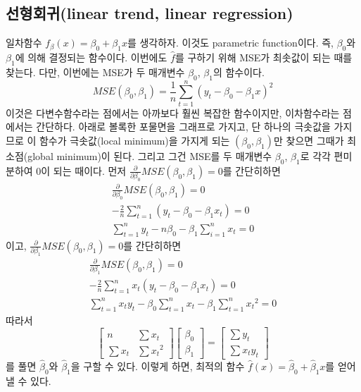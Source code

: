 \documentclass{article}
\begin{document}
\subsection{선형회귀(linear trend, linear regression)}
일차함수 \(f_\beta(x)=\beta_0+\beta_1x\)를 생각하자.\footnotemark
{}
이것도 parametric function이다.
즉, \(\beta_0\)와 \(\beta_1\)에 의해 결정되는 함수이다.
이번에도 \(\hat f\)를 구하기 위해 MSE가 최솟값이 되는 때를 찾는다.
다만, 이번에는 MSE가 두 매개변수 \(\beta_0\), \(\beta_1\)의 함수이다.
\[MSE(\beta_0,\beta_1)=\frac1n\sum_{t=1}^n(y_t-\beta_0-\beta_1x)^2\]
이것은 다변수함수라는 점에서는 아까보다 훨씬 복잡한 함수이지만, 이차함수라는 점에서는 간단하다.
아래로 볼록한 포물면을 그래프로 가지고, 단 하나의 극솟값을 가지므로 이 함수가 극솟값(local minimum)을 가지게 되는 \((\beta_0, \beta_1)\)만 찾으면 그때가 최소점(global minimum)이 된다.
그리고 그건 MSE를 두 매개변수 \(\beta_0\), \(\beta_1\)로 각각 편미분하여 0이 되는 때이다.
먼저 \(\frac{\partial}{\partial\beta_0}MSE(\beta_0,\beta_1)=0\)를 간단히하면
\begin{gather*}
\frac{\partial}{\partial\beta_0}MSE(\beta_0,\beta_1)=0\\
-\frac2n\sum_{t=1}^n(y_t-\beta_0-\beta_1x_t)=0\\
\sum_{t=1}^ny_t-n\beta_0-\beta_1\sum_{i=1}^nx_t=0
\end{gather*}
이고, \(\frac{\partial}{\partial\beta_1}MSE(\beta_0,\beta_1)=0\)를 간단히하면
\begin{gather*}
\frac{\partial}{\partial\beta_1}MSE(\beta_0,\beta_1)=0\\
-\frac2n\sum_{t=1}^nx_t(y_t-\beta_0-\beta_1x_t)=0\\
\sum_{t=1}^nx_ty_t-\beta_0\sum_{t=1}^nx_t-\beta_1\sum_{t=1}^n{x_t}^2=0
\end{gather*}
따라서
\[
\begin{bmatrix}
n&\sum x_t\\
\sum x_t&\sum{x_t}^2
\end{bmatrix}
\begin{bmatrix}
\beta_0\\\beta_1
\end{bmatrix}
=
\begin{bmatrix}
\sum y_t\\\sum x_ty_t
\end{bmatrix}
\]
를 풀면 \(\hat\beta_0\)와 \(\hat\beta_1\)을 구할 수 있다.
이렇게 하면, 최적의 함수 \(\hat f(x)=\hat\beta_0+\hat\beta_1x\)를 얻어낼 수 있다.
\end{document}
